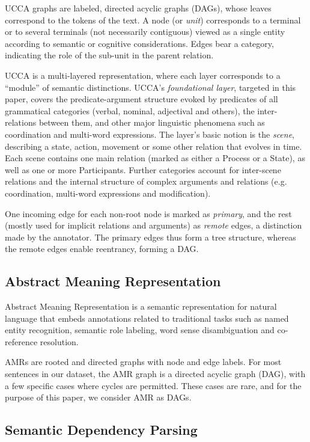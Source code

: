 \documentclass[11pt,a4paper]{article}
\begin{document}
UCCA graphs are labeled, directed acyclic graphs (DAGs),
whose leaves correspond to the tokens of
the text. A node (or {\it unit}) corresponds to a terminal or
to several terminals (not necessarily contiguous) viewed as a
single entity according to semantic or cognitive considerations.
Edges bear a category, indicating the role of the sub-unit in the parent relation.

UCCA is a multi-layered representation, where each layer corresponds
to a ``module'' of semantic distinctions.
UCCA's \textit{foundational layer}, targeted in this paper, covers the predicate-argument
structure evoked by predicates of all grammatical categories
(verbal, nominal, adjectival and others), the inter-relations between them,
and other major linguistic phenomena such as coordination and multi-word expressions.
The layer's basic notion is the \textit{scene},
describing a state, action, movement or some other relation that evolves in time.
Each scene contains one main relation (marked as either a Process or a State),
as well as one or more Participants.
Further categories account for inter-scene relations and the internal structure of
complex arguments and relations (e.g. coordination, multi-word expressions and modification).

One incoming edge for each non-root node is marked as \textit{primary},
and the rest (mostly used for implicit relations and arguments) as \textit{remote} edges,
a distinction made by the annotator.
The primary edges thus form a tree structure, whereas the remote edges enable reentrancy,
forming a DAG.

\subsection{Abstract Meaning Representation}\label{sec:amr}

Abstract Meaning Representation \cite[AMR; ][]{banarescu2013abstract}
is a semantic representation for natural
language that embeds annotations related
to traditional tasks such as named entity
recognition, semantic role labeling, word
sense disambiguation and co-reference
resolution.

AMRs are rooted and directed
graphs with node and edge labels.
For most sentences in our dataset, the
AMR graph is a directed acyclic graph (DAG),
with a few specific cases where cycles are permitted.
These cases are rare, and for the purpose of
this paper, we consider AMR as DAGs.

\subsection{Semantic Dependency Parsing}\label{sec:sdp}
\end{document}
